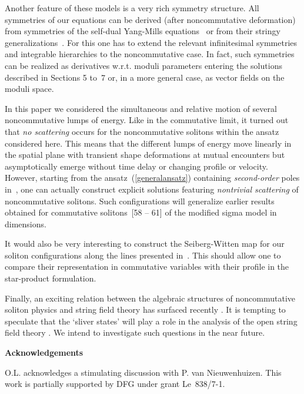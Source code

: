 \documentclass[a4paper,11pt]{article}
\numberwithin{equation}{section}
\begin{document}
Another feature of these models is a very rich symmetry structure.
All symmetries of our equations can be derived
(after noncommutative deformation) from symmetries of the self-dual Yang-Mills
equations~\cite{PP,po} or from their stringy generalizations~\cite{ivle,pole3}.
For this one has to extend the relevant infinitesimal symmetries and integrable
hierarchies to the noncommutative case. In fact, such
symmetries can be realized as derivatives w.r.t. moduli parameters
entering the solutions described in Sections 5 to~7 or, in a more general case,
as vector fields on the moduli space.

In this paper we considered the simultaneous and relative motion of several
noncommutative lumps of energy. Like in the commutative limit,
it turned out that {\it no scattering\/} occurs for the noncommutative
solitons within the ansatz considered here. This means that the different
lumps of energy move linearly in the spatial plane with transient shape
deformations at mutual encounters but asymptotically emerge without
time delay or changing profile or velocity.
However, starting from the ansatz~(\ref{generalansatz})
containing {\it second-order\/} poles in~\myHighlight{$\zeta$}\coordHE{}, one can actually construct explicit
solutions featuring {\it nontrivial scattering\/} of noncommutative solitons.
Such configurations will generalize earlier results obtained for commutative
solitons~[58 -- 61] of the modified sigma model in \coordHE{} dimensions.

It would also be very interesting to construct the Seiberg-Witten map for
our soliton configurations along the lines presented in~\cite{hashi}.
This should allow one to compare their representation in commutative
variables with their profile in the star-product formulation.

Finally, an exciting relation between the algebraic structures of
noncommutative soliton physics and string field theory has surfaced recently
\cite{kost,rast,gross4}. It is tempting to speculate that the `sliver states'
will play a role in the analysis of the open \coordHE{} string field theory
\cite{berk,pole3}. We intend to investigate such questions in the near future.


\bigskip
\noindent
{\large{\bf Acknowledgements}}

\smallskip
\noindent
O.L. acknowledges a stimulating discussion with P. van Nieuwenhuizen.
This work is partially supported by DFG under grant Le~838/7-1.
\end{document}
